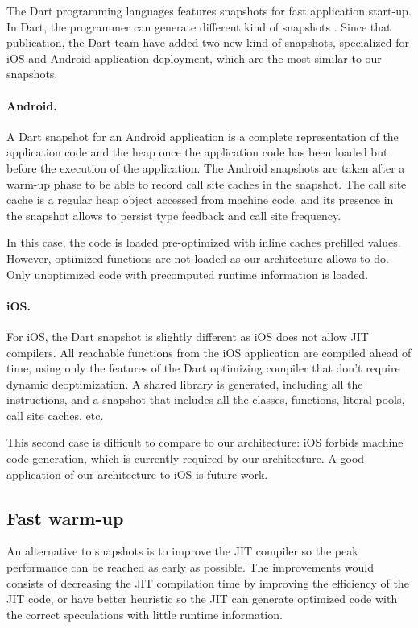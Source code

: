 \documentclass[a4paper,12pt,twoside]{../includes/ThesisStyle}
\begin{document}
The Dart programming languages features snapshots for fast application start-up. In Dart, the programmer can generate different kind of snapshots \cite{Anna13a}. Since that publication, the Dart team have added two new kind of snapshots, specialized for iOS and Android application deployment, which are the most similar to our snapshots.

\paragraph{Android.} A Dart snapshot for an Android application is a complete representation of the application code and the heap once the application code has been loaded but before the execution of the application. The Android snapshots are taken after a warm-up phase to be able to record call site caches in the snapshot. The call site cache is a regular heap object accessed from machine code, and its presence in the snapshot allows to persist type feedback and call site frequency.

In this case, the code is loaded pre-optimized with inline caches prefilled values. However, optimized functions are not loaded as our architecture allows to do. Only unoptimized code with precomputed runtime information is loaded.

\paragraph{iOS.} For iOS, the Dart snapshot is slightly different as iOS does not allow JIT compilers. All reachable functions from the iOS application are compiled ahead of time, using only the features of the Dart optimizing compiler that don't require dynamic deoptimization. A shared library is generated, including all the instructions, and a snapshot that includes all the classes, functions, literal pools, call site caches, etc.

This second case is difficult to compare to our architecture: iOS forbids machine code generation, which is currently required by our architecture. A good application of our architecture to iOS is future work.

\subsection{Fast warm-up}

An alternative to snapshots is to improve the JIT compiler so the peak performance can be reached as early as possible. The improvements would consists of decreasing the JIT compilation time by improving the efficiency of the JIT code, or have better heuristic so the JIT can generate optimized code with the correct speculations with little runtime information.
\end{document}
